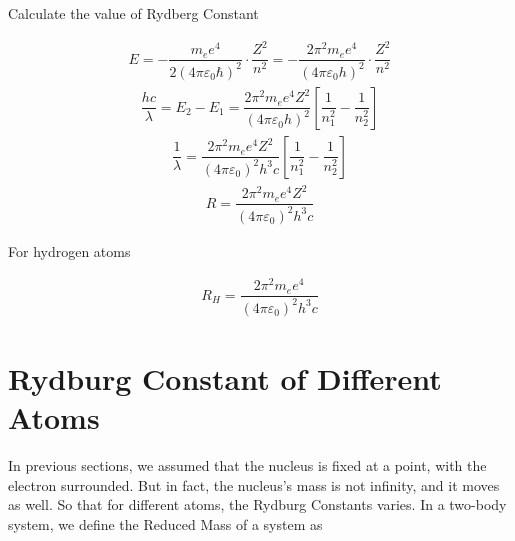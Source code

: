 Calculate the value of Rydberg Constant

\begin{equation*}
  \begin{aligned}
    E = - \dfrac{m_e e^4}{2 \left( 4 \pi \varepsilon_0 \hbar \right)^2} \cdot \dfrac{Z^2}{n^2} = - \dfrac{2 \pi^2 m_e e^4}{\left( 4 \pi \varepsilon_0 h \right)^2} \cdot \dfrac{Z^2}{n^2}
  \end{aligned}
\end{equation*}
\begin{equation*}
  \begin{aligned}
    \dfrac{h c}{\lambda} = E_2 - E_1 =  \dfrac{2 \pi^2 m_e e^4 Z^2}{\left( 4 \pi \varepsilon_0 h \right)^2} \left[ \dfrac{1}{n_1^2} - \dfrac{1}{n_2^2}   \right]
  \end{aligned}
\end{equation*}
\begin{equation*}
  \begin{aligned}
    \dfrac{1}{\lambda} = \dfrac{2 \pi^2 m_e e^4 Z^2}{\left( 4 \pi \varepsilon_0 \right)^2 h^3 c} \left[ \dfrac{1}{n_1^2} - \dfrac{1}{n_2^2}   \right]
  \end{aligned}
\end{equation*}
\begin{equation*}
  \begin{aligned}
    R = \dfrac{2 \pi^2 m_e e^4 Z^2}{\left( 4 \pi \varepsilon_0 \right)^2 h^3 c}
  \end{aligned}
\end{equation*}

For hydrogen atoms

\begin{equation*}
  \begin{aligned}
    R_H = \dfrac{2 \pi^2 m_e e^4}{\left( 4 \pi \varepsilon_0 \right)^2 h^3 c}
  \end{aligned}
\end{equation*}

\section{Rydburg Constant of Different Atoms}

In previous sections, we assumed that the nucleus is fixed at a point, with the electron surrounded. But in fact, the nucleus's mass is not infinity, and it moves as well. So that for different atoms, the Rydburg Constants varies. In a two-body system, we define the Reduced Mass of a system as


